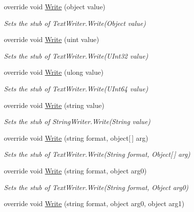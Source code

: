 \begin{DoxyCompactItemize}
override void \hyperlink{class_system_1_1_i_o_1_1_fakes_1_1_stub_string_writer_ab938c9db69d9f2b164ca965a5a36920e}{Write} (object value)
\begin{DoxyCompactList}\small\item\em Sets the stub of Text\-Writer.\-Write(\-Object value)\end{DoxyCompactList}\item 
override void \hyperlink{class_system_1_1_i_o_1_1_fakes_1_1_stub_string_writer_a3e561158fcf6cb6c0838a92c88ac1e63}{Write} (uint value)
\begin{DoxyCompactList}\small\item\em Sets the stub of Text\-Writer.\-Write(\-U\-Int32 value)\end{DoxyCompactList}\item 
override void \hyperlink{class_system_1_1_i_o_1_1_fakes_1_1_stub_string_writer_abac6bb159201d8b4f34f745eb0814fa3}{Write} (ulong value)
\begin{DoxyCompactList}\small\item\em Sets the stub of Text\-Writer.\-Write(\-U\-Int64 value)\end{DoxyCompactList}\item 
override void \hyperlink{class_system_1_1_i_o_1_1_fakes_1_1_stub_string_writer_a71903329ede4f6b22454f3f6490ca5c3}{Write} (string value)
\begin{DoxyCompactList}\small\item\em Sets the stub of String\-Writer.\-Write(\-String value)\end{DoxyCompactList}\item 
override void \hyperlink{class_system_1_1_i_o_1_1_fakes_1_1_stub_string_writer_a266fea661b95a72b77ed0b42d7cb3ed9}{Write} (string format, object\mbox{[}$\,$\mbox{]} arg)
\begin{DoxyCompactList}\small\item\em Sets the stub of Text\-Writer.\-Write(\-String format, Object\mbox{[}$\,$\mbox{]} arg)\end{DoxyCompactList}\item 
override void \hyperlink{class_system_1_1_i_o_1_1_fakes_1_1_stub_string_writer_ae4d05aa380b2acb176d5507e785fb51f}{Write} (string format, object arg0)
\begin{DoxyCompactList}\small\item\em Sets the stub of Text\-Writer.\-Write(\-String format, Object arg0)\end{DoxyCompactList}\item 
override void \hyperlink{class_system_1_1_i_o_1_1_fakes_1_1_stub_string_writer_a2f2760deae0456ae176c11ff03e8d73b}{Write} (string format, object arg0, object arg1)

\end{DoxyCompactItemize}
